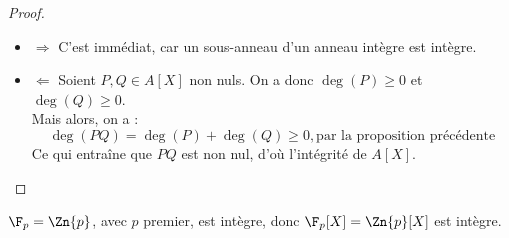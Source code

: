\begin{proof}
	\begin{itemize}
		\item $\Rightarrow$ C'est immédiat, car un sous-anneau d'un anneau intègre est intègre.\\
		\item $\Leftarrow$ Soient $P, Q \in A[X]$ non nuls. On a donc $\deg(P) \geqslant 0$ et $\deg(Q) \geqslant 0$.\\
		      Mais alors, on a :
		      $$ \deg(P Q)=\deg(P)+\deg(Q) \geqslant 0, \text{par la proposition précédente} $$
		      Ce qui entraîne que $P Q$ est non nul, d'où l'intégrité de $A[X]$.
	\end{itemize}
\end{proof}

\begin{exemple}
	$\F_p=\Zn{p}$, avec $p$ premier, est intègre, donc $\F_p[X] = \Zn{p}[X]$ est intègre.
\end{exemple}
